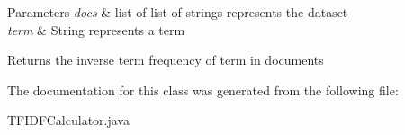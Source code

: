 \begin{DoxyParams}{Parameters}
{\em docs} & list of list of strings represents the dataset \\
\hline
{\em term} & String represents a term \\
\hline
\end{DoxyParams}
\begin{DoxyReturn}{Returns}
the inverse term frequency of term in documents 
\end{DoxyReturn}


The documentation for this class was generated from the following file\+:\begin{DoxyCompactItemize}
\item 
T\+F\+I\+D\+F\+Calculator.\+java\end{DoxyCompactItemize}
